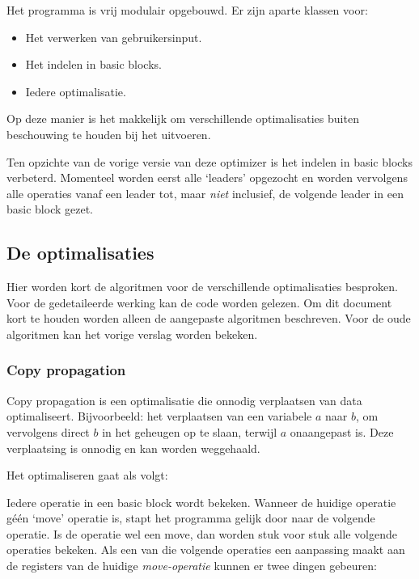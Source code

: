 \documentclass[11pt, a4paper]{uva_report}
\begin{document}
        \noindent Het programma is vrij modulair opgebouwd. Er zijn aparte klassen voor:
        \begin{itemize}
            \item Het verwerken van gebruikersinput.
            \item Het indelen in basic blocks.
            \item Iedere optimalisatie.
        \end{itemize}

        \noindent Op deze manier is het makkelijk om verschillende optimalisaties buiten
        beschouwing te houden bij het uitvoeren.

        Ten opzichte van de vorige versie van deze optimizer is het indelen in
        basic blocks verbeterd. Momenteel worden eerst alle `leaders' opgezocht
        en worden vervolgens alle operaties vanaf een leader tot, maar
        \emph{niet} inclusief, de volgende leader in een basic block gezet.

        \subsection{De optimalisaties}
            Hier worden kort de algoritmen voor de verschillende optimalisaties
            besproken. Voor de gedetaileerde werking kan de code worden gelezen.
            Om dit document kort te houden worden alleen de aangepaste
            algoritmen beschreven. Voor de oude algoritmen kan het vorige
            verslag worden bekeken.

            \subsubsection{Copy propagation}
                Copy propagation is een optimalisatie die onnodig verplaatsen
                van data optimaliseert. Bijvoorbeeld: het verplaatsen van een
                variabele $a$ naar $b$, om vervolgens direct $b$ in het geheugen
                op te slaan, terwijl $a$ onaangepast is. Deze verplaatsing is
                onnodig en kan worden weggehaald.

                Het optimaliseren gaat als volgt:

                Iedere operatie in een basic block wordt bekeken. Wanneer de
                huidige operatie g\'e\'en `move' operatie is, stapt het
                programma gelijk door naar de volgende operatie.  Is de operatie
                wel een move, dan worden stuk voor stuk alle volgende operaties
                bekeken. Als een van die volgende operaties een aanpassing maakt
                aan de registers van de huidige \emph{move-operatie} kunnen er
                twee dingen gebeuren:
\end{document}
